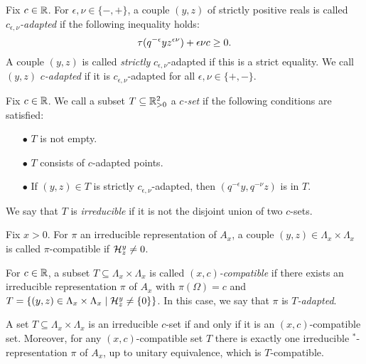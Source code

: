 \begin{Def} Fix $c\in \mathbb{R}$. For $\epsilon,\nu\in \{-,+\}$, a couple $(y,z)$ of strictly positive reals is called \emph{$c_{\epsilon,\nu}$-adapted} if the following inequality holds: \begin{equation}\label{EqAd} \operatorname{\tau}(q^{-\epsilon}yz^{\epsilon\nu})+\epsilon\nu c\geq 0.\end{equation} A couple $(y,z)$ is called \emph{strictly} $c_{\epsilon,\nu}$-adapted if this is a strict equality. We call $(y,z)$ \emph{$c$-adapted} if it is $c_{\epsilon,\nu}$-adapted for all $\epsilon,\nu\in \{+,-\}$. 
\end{Def} 

\begin{Def} Fix $c\in \mathbb{R}$. We call a subset $T\subseteq \mathbb{R}_{>0}^2$ a \emph{$c$-set} if the following conditions are satisfied: 
\begin{itemize} 
\item[$\bullet$] $T$ is not empty.
\item[$\bullet$] $T$ consists of $c$-adapted points.
\item[$\bullet$] If $(y,z)\in T$ is strictly $c_{\epsilon,\nu}$-adapted, then $(q^{-\epsilon}y,q^{-\nu}z)$ is in $T$.
\end{itemize}

We say that $T$ is \emph{irreducible} if it is not the disjoint union of two $c$-sets.

\end{Def}

\begin{Def} Fix $x>0$. For $\pi$ an irreducible representation of $A_x$, a couple $(y,z)\in \Lambda_x\times \Lambda_x$ is called $\pi$-compatible if $\mathcal{H}^y_z\neq 0$. 

For $c\in \mathbb{R}$, a subset $T\subseteq \Lambda_x\times \Lambda_x$ is called \emph{$(x,c)$-compatible} if there exists an irreducible representation $\pi$ of $A_x$ with $\pi(\Omega) = c$ and $T=\{(y,z)\in \Lambda_x\times \Lambda_x\mid \mathcal{H}^{y}_{z}\neq \{0\}\}$. In this case, we say that $\pi$ is \emph{$T$-adapted}.
\end{Def}

\begin{Prop}\label{PropClassRep} A set $T\subseteq \Lambda_x\times \Lambda_x$ is an irreducible $c$-set if and only if it is an $(x,c)$-compatible set. Moreover, for any $(x,c)$-compatible set $T$ there is exactly one irreducible $^*$-representation $\pi$ of $A_x$, up to unitary equivalence, which is $T$-compatible.
\end{Prop}

